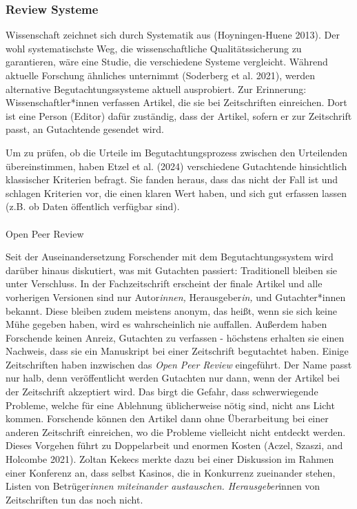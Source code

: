 \documentclass[
  letterpaper,
  DIV=11,
  numbers=noendperiod]{scrreprt}
\makeatletter
\let\oldparagraph\paragraph
\renewcommand{\paragraph}{
    \@ifstar
      \xxxParagraphStar
      \xxxParagraphNoStar
  }
\newcommand{\xxxParagraphStar}[1]{\oldparagraph*{#1}\mbox{}}
\newcommand{\xxxParagraphNoStar}[1]{\oldparagraph{#1}\mbox{}}
\makeatother
\begin{document}
\subsubsection{Review Systeme}\label{review-systeme}

Wissenschaft zeichnet sich durch Systematik aus (Hoyningen-Huene 2013).
Der wohl systematischste Weg, die wissenschaftliche Qualitätssicherung
zu garantieren, wäre eine Studie, die verschiedene Systeme vergleicht.
Während aktuelle Forschung ähnliches unternimmt (Soderberg et al. 2021),
werden alternative Begutachtungssysteme aktuell ausprobiert. Zur
Erinnerung: Wissenschaftler*innen verfassen Artikel, die sie bei
Zeitschriften einreichen. Dort ist eine Person (Editor) dafür zuständig,
dass der Artikel, sofern er zur Zeitschrift passt, an Gutachtende
gesendet wird.

Um zu prüfen, ob die Urteile im Begutachtungsprozess zwischen den
Urteilenden übereinstimmen, haben Etzel et al. (2024) verschiedene
Gutachtende hinsichtlich klassischer Kriterien befragt. Sie fanden
heraus, dass das nicht der Fall ist und schlagen Kriterien vor, die
einen klaren Wert haben, und sich gut erfassen lassen (z.B. ob Daten
öffentlich verfügbar sind).

\paragraph{Open Peer Review}\label{open-peer-review}

Seit der Auseinandersetzung Forschender mit dem Begutachtungssystem wird
darüber hinaus diskutiert, was mit Gutachten passiert: Traditionell
bleiben sie unter Verschluss. In der Fachzeitschrift erscheint der
finale Artikel und alle vorherigen Versionen sind nur Autor\emph{innen,}
Herausgeber\emph{in,} und Gutachter*innen bekannt. Diese bleiben zudem
meistens anonym, das heißt, wenn sie sich keine Mühe gegeben haben, wird
es wahrscheinlich nie auffallen. Außerdem haben Forschende keinen
Anreiz, Gutachten zu verfassen - höchstens erhalten sie einen Nachweis,
dass sie ein Manuskript bei einer Zeitschrift begutachtet haben. Einige
Zeitschriften haben inzwischen das \emph{Open Peer Review} eingeführt.
Der Name passt nur halb, denn veröffentlicht werden Gutachten nur dann,
wenn der Artikel bei der Zeitschrift akzeptiert wird. Das birgt die
Gefahr, dass schwerwiegende Probleme, welche für eine Ablehnung
üblicherweise nötig sind, nicht ans Licht kommen. Forschende können den
Artikel dann ohne Überarbeitung bei einer anderen Zeitschrift
einreichen, wo die Probleme vielleicht nicht entdeckt werden. Dieses
Vorgehen führt zu Doppelarbeit und enormen Kosten (Aczel, Szaszi, and
Holcombe 2021). Zoltan Kekecs merkte dazu bei einer Diskussion im Rahmen
einer Konferenz an, dass selbst Kasinos, die in Konkurrenz zueinander
stehen, Listen von Betrüger\emph{innen miteinander austauschen.
Herausgeber}innen von Zeitschriften tun das noch nicht.
\end{document}
